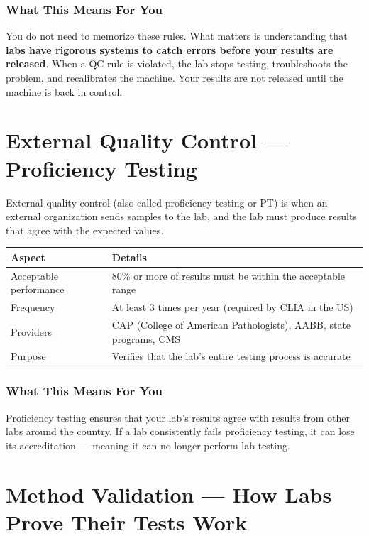 \subsubsection{What This Means For You}

You do not need to memorize these rules. What matters is understanding that \textbf{labs have rigorous systems to catch errors before your results are released}. When a QC rule is violated, the lab stops testing, troubleshoots the problem, and recalibrates the machine. Your results are not released until the machine is back in control.

\clearpage
\section{External Quality Control --- Proficiency Testing}

External quality control (also called proficiency testing or PT) is when an external organization sends samples to the lab, and the lab must produce results that agree with the expected values.

\begin{longtable}{@{}ll@{}}
\toprule
\textbf{Aspect} & \textbf{Details} \\
\midrule
Acceptable performance & 80\% or more of results must be within the acceptable range \\
Frequency & At least 3 times per year (required by CLIA in the US) \\
Providers & CAP (College of American Pathologists), AABB, state programs, CMS \\
Purpose & Verifies that the lab's entire testing process is accurate \\
\bottomrule
\end{longtable}

\subsubsection{What This Means For You}

Proficiency testing ensures that your lab's results agree with results from other labs around the country. If a lab consistently fails proficiency testing, it can lose its accreditation --- meaning it can no longer perform lab testing.

\clearpage
\section{Method Validation --- How Labs Prove Their Tests Work}

